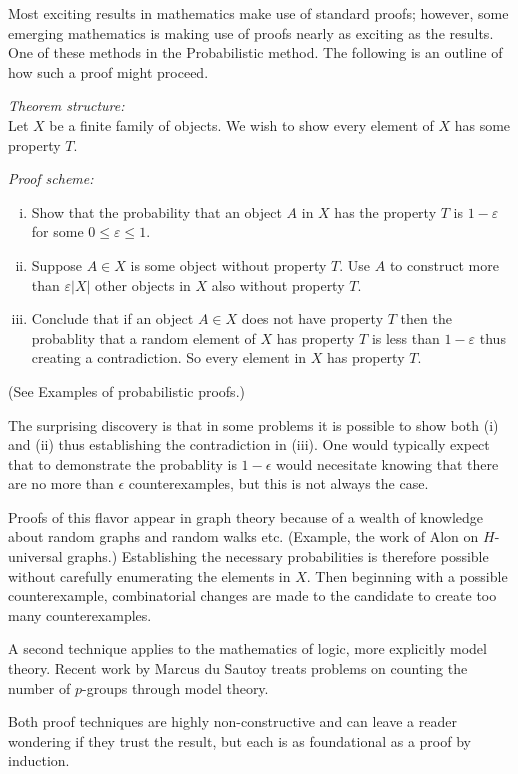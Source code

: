 \documentclass[12pt]{article}
\begin{document}
Most exciting results in mathematics make use of standard proofs; however, some emerging mathematics is making use of proofs nearly as exciting as the results.  One of these methods in the Probabilistic method.  The following is an outline of how such a proof might proceed.

\emph{Theorem structure:}\\
Let $X$ be a finite family of objects.  We wish to show every element of $X$ has some property $T$.

\emph{Proof scheme:}
\begin{enumerate}[(i)]
\item Show that the probability that an object $A$ in $X$ has the property $T$ is $1-\varepsilon$ for some $0\leq \varepsilon\leq 1$.
\item Suppose $A\in X$ is some object without property $T$.  Use $A$ to construct 
more than $\varepsilon|X|$ other objects in $X$ also without property $T$.
\item Conclude that if an object $A\in X$ does not have property $T$ then the probablity that a random element of $X$ has property $T$ is less than $1-\varepsilon$ thus creating a contradiction.  So every element in $X$ has property $T$.
\end{enumerate}

(See Examples of probabilistic proofs.)

The surprising discovery is that in some problems it is possible to show both (i) and (ii) thus establishing the contradiction in (iii).  One would typically expect that to demonstrate the probablity is $1-\epsilon$ would necesitate knowing that there are no more than $\epsilon$ counterexamples, but this is not always the case.

Proofs of this flavor appear in graph theory because of a wealth of knowledge about random graphs and random walks etc.  (Example, the work of Alon on $H$-universal graphs.)  Establishing the necessary probabilities is therefore  possible without carefully enumerating the elements in $X$.  Then beginning with a possible counterexample, combinatorial changes are made to the candidate to create too many counterexamples.

A second technique applies to the mathematics of logic, more explicitly model theory.  Recent work by Marcus du Sautoy treats problems on counting the number of $p$-groups through model theory.

Both proof techniques are highly non-constructive and can leave a reader wondering if they trust the result, but each is as foundational as a proof by induction.
\end{document}
